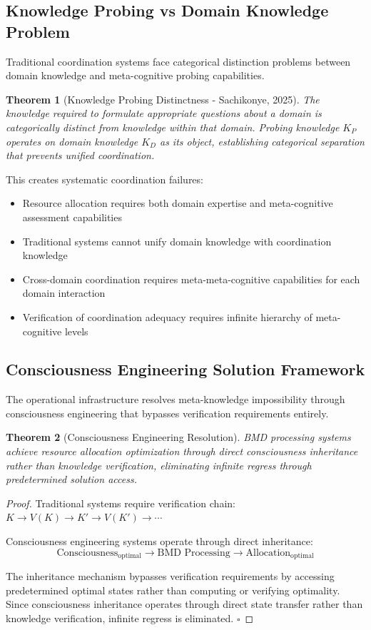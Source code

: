 \documentclass[12pt,a4paper]{article}
\newtheorem{theorem}{Theorem}[section]
\begin{document}
\subsection{Knowledge Probing vs Domain Knowledge Problem}

Traditional coordination systems face categorical distinction problems between domain knowledge and meta-cognitive probing capabilities.

\begin{theorem}[Knowledge Probing Distinctness - Sachikonye, 2025]
The knowledge required to formulate appropriate questions about a domain is categorically distinct from knowledge within that domain. Probing knowledge $K_P$ operates on domain knowledge $K_D$ as its object, establishing categorical separation that prevents unified coordination.
\end{theorem}

This creates systematic coordination failures:
\begin{itemize}
\item Resource allocation requires both domain expertise and meta-cognitive assessment capabilities
\item Traditional systems cannot unify domain knowledge with coordination knowledge
\item Cross-domain coordination requires meta-meta-cognitive capabilities for each domain interaction
\item Verification of coordination adequacy requires infinite hierarchy of meta-cognitive levels
\end{itemize}

\subsection{Consciousness Engineering Solution Framework}

The operational infrastructure resolves meta-knowledge impossibility through consciousness engineering that bypasses verification requirements entirely.

\begin{theorem}[Consciousness Engineering Resolution]
BMD processing systems achieve resource allocation optimization through direct consciousness inheritance rather than knowledge verification, eliminating infinite regress through predetermined solution access.
\end{theorem}

\begin{proof}
Traditional systems require verification chain: $K \rightarrow V(K) \rightarrow K' \rightarrow V(K') \rightarrow \cdots$

Consciousness engineering systems operate through direct inheritance:
$$\text{Consciousness}_{\text{optimal}} \rightarrow \text{BMD Processing} \rightarrow \text{Allocation}_{\text{optimal}}$$

The inheritance mechanism bypasses verification requirements by accessing predetermined optimal states rather than computing or verifying optimality. Since consciousness inheritance operates through direct state transfer rather than knowledge verification, infinite regress is eliminated. $\square$
\end{proof}
\end{document}
